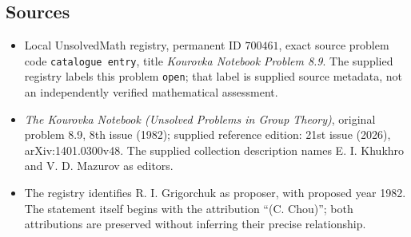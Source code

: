 \documentclass[11pt]{article}
\begin{document}
\subsection{Sources}
\begin{itemize}
\item Local UnsolvedMath registry, permanent ID \(700461\), exact source problem code \texttt{catalogue entry}, title \emph{Kourovka Notebook Problem 8.9}. The supplied registry labels this problem \texttt{open}; that label is supplied source metadata, not an independently verified mathematical assessment.
\item \emph{The Kourovka Notebook (Unsolved Problems in Group Theory)}, original problem 8.9, 8th issue (1982); supplied reference edition: 21st issue (2026), arXiv:1401.0300v48. The supplied collection description names E. I. Khukhro and V. D. Mazurov as editors.
\item The registry identifies R. I. Grigorchuk as proposer, with proposed year 1982. The statement itself begins with the attribution ``(C. Chou)''; both attributions are preserved without inferring their precise relationship.
\end{itemize}
\end{document}
